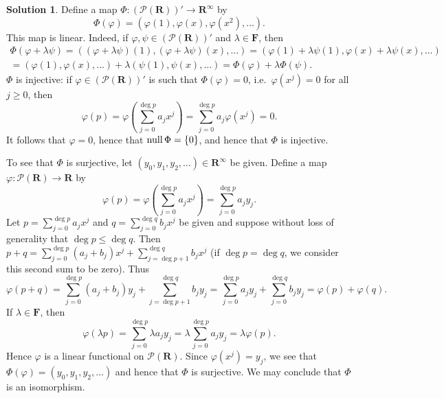 \documentclass[12pt]{article}
\theoremstyle{definition}
\theoremstyle{exercise}
\theoremstyle{solution}
\newtheorem*{solution}{Solution}
\newcommand{\poly}{\mathcal{P}}
\newcommand{\Null}{\text{null\,}}
\newcommand{\R}{\mathbf{R}}
\newcommand{\F}{\mathbf{F}}
\begin{document}
\begin{solution}
    Define a map \( \Phi : (\poly(\R))' \to \R^{\infty} \) by
    \[
        \Phi(\varphi) = (\varphi(1), \varphi(x), \varphi(x^2), \ldots).
    \]
    This map is linear. Indeed, if \( \varphi, \psi \in (\poly(\R))' \) and \( \lambda \in \F \), then
    \begin{multline*}
        \Phi(\varphi + \lambda \psi) = ((\varphi + \lambda \psi)(1), (\varphi + \lambda \psi)(x), \ldots) = (\varphi(1) + \lambda \psi(1), \varphi(x) + \lambda \psi(x), \ldots) \\ = (\varphi(1), \varphi(x), \ldots) + \lambda (\psi(1), \psi(x), \ldots) = \Phi(\varphi) + \lambda \Phi(\psi).
    \end{multline*}
    \( \Phi \) is injective: if \( \varphi \in (\poly(\R))' \) is such that \( \Phi(\varphi) = 0 \), i.e.\ \( \varphi(x^j) = 0 \) for all \( j \geq 0 \), then
    \[
        \varphi(p) = \varphi \left( \sum_{j=0}^{\deg p} a_j x^j \right) = \sum_{j=0}^{\deg p} a_j \varphi(x^j) = 0.
    \]
    It follows that \( \varphi = 0 \), hence that \( \Null \Phi = \{ 0 \} \), and hence that \( \Phi \) is injective.

    To see that \( \Phi \) is surjective, let \( (y_0, y_1, y_2, \ldots) \in \R^{\infty} \) be given. Define a map \( \varphi : \poly(\R) \to \R \) by
    \[
        \varphi(p) = \varphi \left( \sum_{j=0}^{\deg p} a_j x^j \right) = \sum_{j=0}^{\deg p} a_j y_j.
    \]
    Let \( p = \sum_{j=0}^{\deg p} a_j x^j \) and \( q = \sum_{j=0}^{\deg q} b_j x^j \) be given and suppose without loss of generality that \( \deg p \leq \deg q \). Then \( p + q = \sum_{j=0}^{\deg p} (a_j + b_j) x^j + \sum_{j=\deg p + 1}^{\deg q} b_j x^j \) (if \( \deg p = \deg q \), we consider this second sum to be zero). Thus
    \[
        \varphi(p + q) = \sum_{j=0}^{\deg p} (a_j + b_j) y_j + \sum_{j=\deg p + 1}^{\deg q} b_j y_j = \sum_{j=0}^{\deg p} a_j y_j + \sum_{j=0}^{\deg q} b_j y_j = \varphi(p) + \varphi(q).
    \]
    If \( \lambda \in \F \), then
    \[
        \varphi(\lambda p) = \sum_{j=0}^{\deg p} \lambda a_j y_j = \lambda \sum_{j=0}^{\deg p} a_j y_j = \lambda \varphi(p).
    \]
    Hence \( \varphi \) is a linear functional on \( \poly(\R) \). Since \( \varphi(x^j) = y_j \), we see that \( \Phi(\varphi) = (y_0, y_1, y_2, \ldots) \) and hence that \( \Phi \) is surjective. We may conclude that \( \Phi \) is an isomorphism.
\end{solution}
\end{document}
